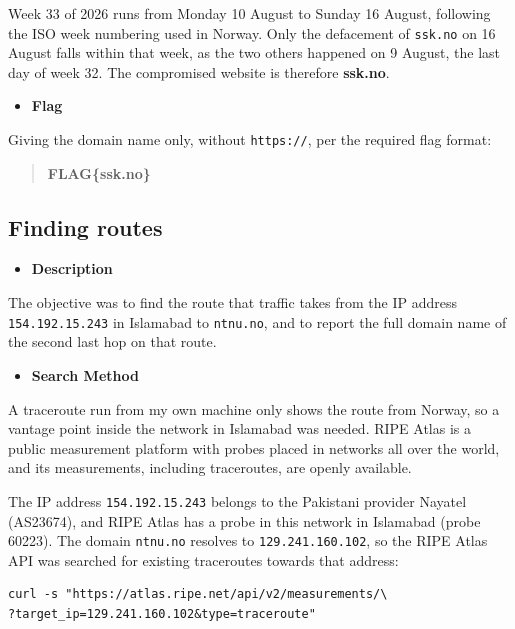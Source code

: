 \documentclass[11pt]{article}
\begin{document}
\noindent Week 33 of 2026 runs from Monday 10 August to Sunday 16 August, following the ISO week numbering used in Norway. Only the defacement of \texttt{ssk.no} on 16 August falls within that week, as the two others happened on 9 August, the last day of week 32. The compromised website is therefore \textbf{ssk.no}.

\begin{itemize}[leftmargin=1.5em]
    \item \textbf{Flag}
\end{itemize}
\noindent Giving the domain name only, without \texttt{https://}, per the required flag format:

\begin{quote}
\textbf{FLAG\{ssk.no\}}
\end{quote}

\subsection{Finding routes}

\begin{itemize}[leftmargin=1.5em]
    \item \textbf{Description}
\end{itemize}
\noindent The objective was to find the route that traffic takes from the IP address \texttt{154.192.15.243} in Islamabad to \texttt{ntnu.no}, and to report the full domain name of the second last hop on that route.

\begin{itemize}[leftmargin=1.5em]
    \item \textbf{Search Method}
\end{itemize}
\noindent A traceroute run from my own machine only shows the route from Norway, so a vantage point inside the network in Islamabad was needed. RIPE Atlas is a public measurement platform with probes placed in networks all over the world, and its measurements, including traceroutes, are openly available.

\noindent The IP address \texttt{154.192.15.243} belongs to the Pakistani provider Nayatel (AS23674), and RIPE Atlas has a probe in this network in Islamabad (probe 60223). The domain \texttt{ntnu.no} resolves to \texttt{129.241.160.102}, so the RIPE Atlas API was searched for existing traceroutes towards that address:

\begin{verbatim}
curl -s "https://atlas.ripe.net/api/v2/measurements/\
?target_ip=129.241.160.102&type=traceroute"
\end{verbatim}
\end{document}
